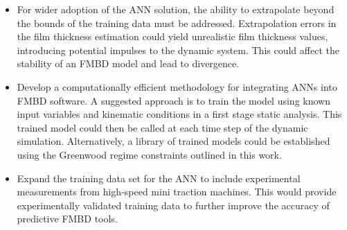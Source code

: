 \begin{itemize}
	\item For wider adoption of the ANN solution, the ability to extrapolate beyond the bounds of the training data must be addressed. Extrapolation errors in the film thickness estimation could yield unrealistic film thickness values, introducing potential impulses to the dynamic system. This could  affect the stability of an FMBD model and lead to divergence.
	\item Develop a computationally efficient methodology for integrating ANNs into FMBD software. A suggested approach is to train the model using known input variables and kinematic conditions in a first stage static analysis. This trained model could then be called at each time step of the dynamic simulation. Alternatively, a library of trained models could be established using the Greenwood regime constraints outlined in this work.
	\item Expand the training data set for the ANN to include experimental measurements from high-speed mini traction machines. This would provide experimentally validated training data to further improve the accuracy of predictive FMBD tools.
\end{itemize}